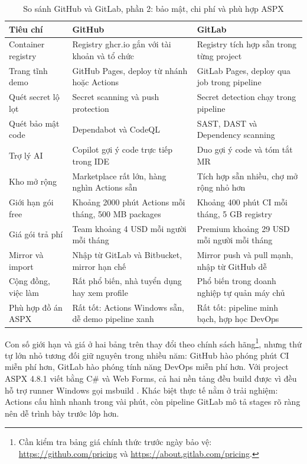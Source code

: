 \begin{table}[H]
\centering
\caption{So sánh GitHub và GitLab, phần 2: bảo mật, chi phí và phù hợp ASPX}
\label{tab:c6-gh-gl-2}
\begin{tabular}{p{3.2cm}p{5.4cm}p{5.4cm}}
\toprule
Tiêu chí & GitHub & GitLab \\
\midrule
Container registry & Registry ghcr.io gắn với tài khoản và tổ chức & Registry tích hợp sẵn trong từng project \\
Trang tĩnh demo & GitHub Pages, deploy từ nhánh hoặc Actions & GitLab Pages, deploy qua job trong pipeline \\
Quét secret lộ lọt & Secret scanning và push protection & Secret detection chạy trong pipeline \\
Quét bảo mật code & Dependabot và CodeQL \cite{githubdocs} & SAST, DAST và Dependency scanning \cite{gitlabdocs} \\
Trợ lý AI & Copilot gợi ý code trực tiếp trong IDE & Duo gợi ý code và tóm tắt MR \\
Kho mở rộng & Marketplace rất lớn, hàng nghìn Actions sẵn & Tích hợp sẵn nhiều, chợ mở rộng nhỏ hơn \\
Giới hạn gói free & Khoảng 2000 phút Actions mỗi tháng, 500 MB packages & Khoảng 400 phút CI mỗi tháng, 5 GB registry \\
Giá gói trả phí & Team khoảng 4 USD mỗi người mỗi tháng & Premium khoảng 29 USD mỗi người mỗi tháng \\
Mirror và import & Nhập từ GitLab và Bitbucket, mirror hạn chế & Mirror push và pull mạnh, nhập từ GitHub dễ \\
Cộng đồng, việc làm & Rất phổ biến, nhà tuyển dụng hay xem profile & Phổ biến trong doanh nghiệp tự quản máy chủ \\
Phù hợp đồ án ASPX & Rất tốt: Actions Windows sẵn, dễ demo pipeline xanh & Rất tốt: pipeline minh bạch, hợp học DevOps \\
\bottomrule
\end{tabular}
\end{table}

Con số giới hạn và giá ở hai bảng trên thay đổi theo chính sách hãng\footnote{Cần kiểm tra bảng giá chính thức trước ngày bảo vệ: \url{https://github.com/pricing} và \url{https://about.gitlab.com/pricing}.},
nhưng thứ tự lớn nhỏ tương đối giữ nguyên trong nhiều năm:
GitHub hào phóng phút CI miễn phí hơn, GitLab hào phóng tính năng DevOps miễn phí hơn.
Với project ASPX 4.8.1 viết bằng C\# và Web Forms, cả hai nền tảng đều build được
vì đều hỗ trợ runner Windows gọi msbuild \cite{msmsbuild}.
Khác biệt thực tế nằm ở trải nghiệm: Actions cấu hình nhanh trong vài phút,
còn pipeline GitLab mô tả stages rõ ràng nên dễ trình bày trước lớp hơn.

